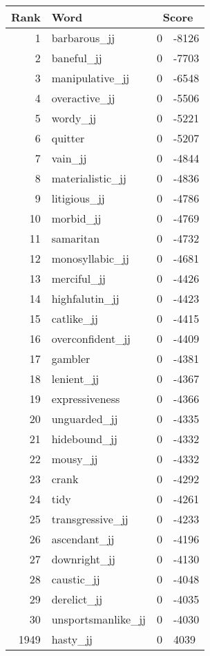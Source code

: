 \begin{longtable}[!htbp]{| rlr@{.}l |}
    \hline
    \textbf{Rank} & \textbf{Word} & \multicolumn{2}{c|}{\textbf{Score}} \\
    \hline
    \endhead
    1 & barbarous\_jj & 0 & -8126 \\
    2 & baneful\_jj & 0 & -7703 \\
    3 & manipulative\_jj & 0 & -6548 \\
    4 & overactive\_jj & 0 & -5506 \\
    5 & wordy\_jj & 0 & -5221 \\
    6 & quitter & 0 & -5207 \\
    7 & vain\_jj & 0 & -4844 \\
    8 & materialistic\_jj & 0 & -4836 \\
    9 & litigious\_jj & 0 & -4786 \\
    10 & morbid\_jj & 0 & -4769 \\
    11 & samaritan & 0 & -4732 \\
    12 & monosyllabic\_jj & 0 & -4681 \\
    13 & merciful\_jj & 0 & -4426 \\
    14 & highfalutin\_jj & 0 & -4423 \\
    15 & catlike\_jj & 0 & -4415 \\
    16 & overconfident\_jj & 0 & -4409 \\
    17 & gambler & 0 & -4381 \\
    18 & lenient\_jj & 0 & -4367 \\
    19 & expressiveness & 0 & -4366 \\
    20 & unguarded\_jj & 0 & -4335 \\
    21 & hidebound\_jj & 0 & -4332 \\
    22 & mousy\_jj & 0 & -4332 \\
    23 & crank & 0 & -4292 \\
    24 & tidy & 0 & -4261 \\
    25 & transgressive\_jj & 0 & -4233 \\
    26 & ascendant\_jj & 0 & -4196 \\
    27 & downright\_jj & 0 & -4130 \\
    28 & caustic\_jj & 0 & -4048 \\
    29 & derelict\_jj & 0 & -4035 \\
    30 & unsportsmanlike\_jj & 0 & -4030 \\
    1949 & hasty\_jj & 0 & 4039 \\

\end{longtable}
